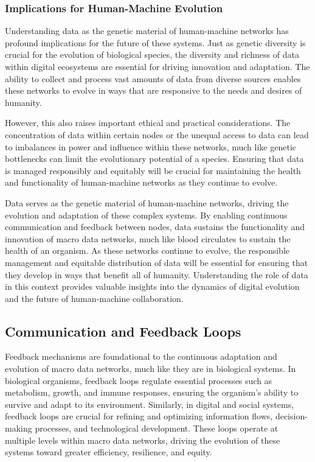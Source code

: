 \documentclass[12pt,twoside]{article}
\begin{document}
\subsubsection{Implications for Human-Machine Evolution}

Understanding data as the genetic material of human-machine networks has profound implications for the future of these systems. Just as genetic diversity is crucial for the evolution of biological species, the diversity and richness of data within digital ecosystems are essential for driving innovation and adaptation. The ability to collect and process vast amounts of data from diverse sources enables these networks to evolve in ways that are responsive to the needs and desires of humanity.

However, this also raises important ethical and practical considerations. The concentration of data within certain nodes or the unequal access to data can lead to imbalances in power and influence within these networks, much like genetic bottlenecks can limit the evolutionary potential of a species. Ensuring that data is managed responsibly and equitably will be crucial for maintaining the health and functionality of human-machine networks as they continue to evolve.

Data serves as the genetic material of human-machine networks, driving the evolution and adaptation of these complex systems. By enabling continuous communication and feedback between nodes, data sustains the functionality and innovation of macro data networks, much like blood circulates to sustain the health of an organism. As these networks continue to evolve, the responsible management and equitable distribution of data will be essential for ensuring that they develop in ways that benefit all of humanity. Understanding the role of data in this context provides valuable insights into the dynamics of digital evolution and the future of human-machine collaboration.

\subsection{Communication and Feedback Loops}

Feedback mechanisms are foundational to the continuous adaptation and evolution of macro data networks, much like they are in biological systems. In biological organisms, feedback loops regulate essential processes such as metabolism, growth, and immune responses, ensuring the organism’s ability to survive and adapt to its environment. Similarly, in digital and social systems, feedback loops are crucial for refining and optimizing information flows, decision-making processes, and technological development. These loops operate at multiple levels within macro data networks, driving the evolution of these systems toward greater efficiency, resilience, and equity.
\end{document}

